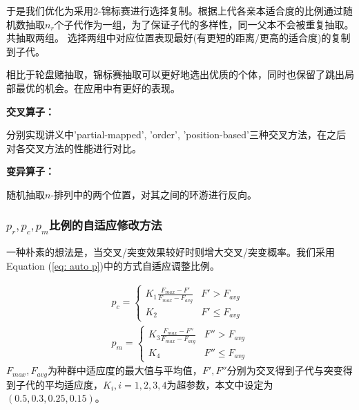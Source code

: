 \documentclass[12pt]{article}
\begin{document}
于是我们优化为采用2-锦标赛进行选择复制。根据上代各亲本适合度的比例通过随机数抽取$n_r$个子代作为一组，为了保证子代的多样性，同一父本不会被重复抽取。共抽取两组。
选择两组中对应位置表现最好(有更短的距离/更高的适合度)的复制到子代。

相比于轮盘赌抽取，锦标赛抽取可以更好地选出优质的个体，同时也保留了跳出局部最优的机会。在应用中有更好的表现。

\textbf{交叉算子：}

分别实现讲义中'partial-mapped', 'order', 'position-based'三种交叉方法，在之后对各交叉方法的性能进行对比。

\textbf{变异算子：}

随机抽取$n$-排列中的两个位置，对其之间的环游进行反向。

\subsubsection{$p_r,p_c,p_m$比例的自适应修改方法}
一种朴素的想法是，当交叉/突变效果较好时则增大交叉/突变概率。我们采用Equation (\ref{eq: auto p})中的方式自适应调整比例\cite{Ref1}。

\begin{equation}
    \begin{aligned}
        p_c = \left\{
        \begin{array}{cc}
            K_1\frac{F_{max} - F'}{F_{max} - F_{avg}} & F' > F_{avg} \\
            K_2 & F' \le F_{avg}
        \end{array} 
        \right.
        \\
        p_m = \left\{
        \begin{array}{cc}
            K_3\frac{F_{max} - F''}{F_{max} - F_{avg}} & F'' > F_{avg} \\
            K_4 & F'' \le F_{avg}
        \end{array} 
        \right.
    \end{aligned}    
    \label{eq: auto p}
\end{equation}
$F_{max},F_{avg}$为种群中适应度的最大值与平均值，$F',F''$分别为交叉得到子代与突变得到子代的平均适应度，$K_i,i=1,2,3,4$为超参数，本文中设定为$ (0.5, 0.3, 0.25, 0.15)$。
\end{document}
